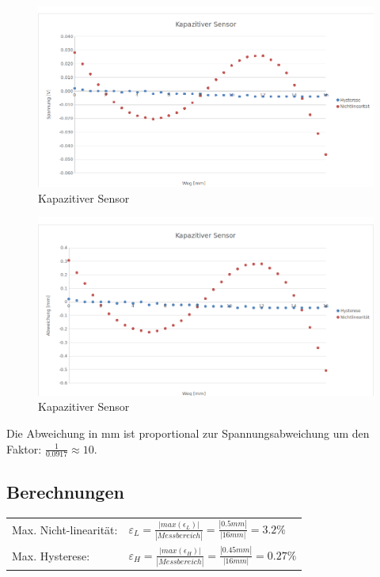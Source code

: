 \begin{figure}[H]
    \centering
    \includegraphics[scale=0.5]{pic/kapazitiv_spannung.png}
    \caption{Kapazitiver Sensor}
    \label{fig:kapazitiv}
\end{figure}


\begin{figure}[H]
    \centering
    \includegraphics[scale=0.5]{pic/kapazitiv_abweichung.png}
    \caption{Kapazitiver Sensor}
    \label{fig:kapazitiv}
\end{figure}

Die Abweichung in mm ist proportional zur Spannungsabweichung um den Faktor: $\frac{1}{0.0917} \approx 10$.

\subsection{Berechnungen}

\begin{tabular}{ l  l }
    Max. Nicht-linearität: & $\varepsilon_L = \frac{|max(\epsilon_L)|}{|Messbereich|}
                                            = \frac{|0.5mm|}{|16mm|}  
                                            = 3.2\%                             $  \\
    Max. Hysterese:        & $\varepsilon_H = \frac{|max(\epsilon_H)|}{|Messbereich|}
                                            = \frac{|0.45mm|}{|16mm|} 
                                            = 0.27\%                             $  \\
\end{tabular}

\clearpage